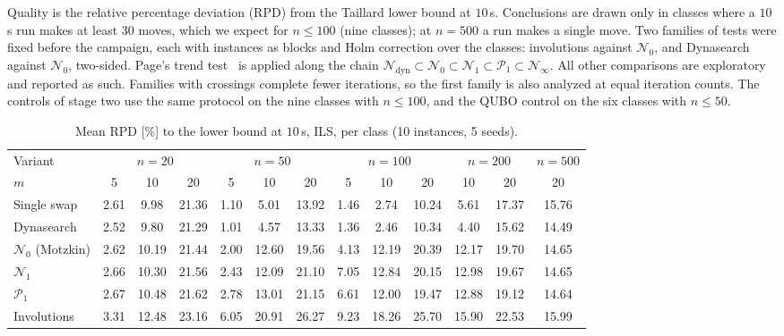 \documentclass{article}
\newcommand{\N}{\mathcal{N}}
\newcommand{\Pa}{\mathcal{P}}
\begin{document}
Quality is the relative percentage deviation (RPD) from the Taillard
lower bound at $10$\,s. Conclusions are drawn only in classes where a
$10$\,s run makes at least 30 moves, which we expect for $n\leq100$ (nine
classes); at $n=500$ a run makes a single move. Two families of tests
were fixed before the campaign, each with instances as blocks and Holm
correction over the classes: involutions against $\N_0$, and Dynasearch
against $\N_0$, two-sided. Page's trend test~\cite{page1963} is applied
along the chain
$\N_{\mathrm{dyn}}\subset\N_0\subset\N_1\subset\Pa_1\subset\N_\infty$.
All other comparisons are exploratory and reported as such. Families
with crossings complete fewer iterations, so the first family is also
analyzed at equal iteration counts. The controls of stage two use the
same protocol on the nine classes with $n\leq100$, and the QUBO control
on the six classes with $n\leq50$.

\begin{table}[t]
\centering
\caption{Mean RPD [\%] to the lower bound at $10$\,s, ILS, per class
(10 instances, 5 seeds).}
\label{tab:main}
\small
\begin{tabular}{@{}l*{12}{c}@{}}
\toprule
Variant & \multicolumn{3}{c}{$n=20$} & \multicolumn{3}{c}{$n=50$} &
\multicolumn{3}{c}{$n=100$} & \multicolumn{2}{c}{$n=200$} & $n=500$ \\
$m$ & 5 & 10 & 20 & 5 & 10 & 20 & 5 & 10 & 20 & 10 & 20 & 20 \\
\midrule
Single swap & 2.61 & 9.98 & 21.36 & 1.10 & 5.01 & 13.92 & 1.46 & 2.74 & 10.24 & 5.61 & 17.37 & 15.76 \\
Dynasearch & 2.52 & 9.80 & 21.29 & 1.01 & 4.57 & 13.33 & 1.36 & 2.46 & 10.34 & 4.40 & 15.62 & 14.49 \\
$\N_0$ (Motzkin) & 2.62 & 10.19 & 21.44 & 2.00 & 12.60 & 19.56 & 4.13 & 12.19 & 20.39 & 12.17 & 19.70 & 14.65 \\
$\N_1$ & 2.66 & 10.30 & 21.56 & 2.43 & 12.09 & 21.10 & 7.05 & 12.84 & 20.15 & 12.98 & 19.67 & 14.65 \\
$\Pa_1$ & 2.67 & 10.48 & 21.62 & 2.78 & 13.01 & 21.15 & 6.61 & 12.00 & 19.47 & 12.88 & 19.12 & 14.64 \\
Involutions & 3.31 & 12.48 & 23.16 & 6.05 & 20.91 & 26.27 & 9.23 & 18.26 & 25.70 & 15.90 & 22.53 & 15.99 \\
\bottomrule
\end{tabular}
\end{table}
\end{document}
